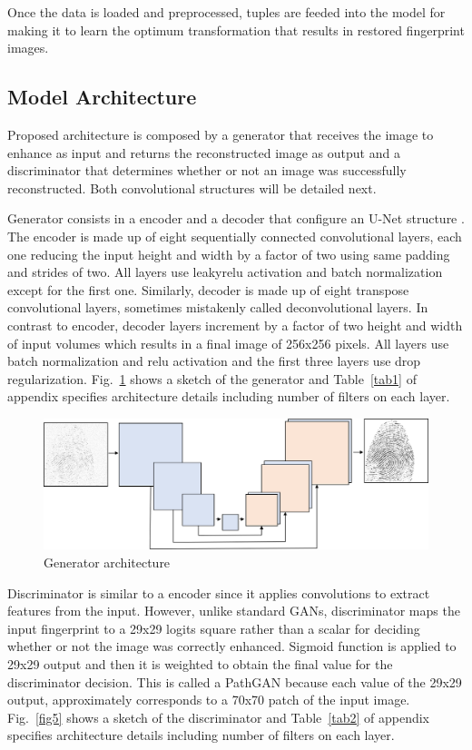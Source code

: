 \documentclass[a4paper,fleqn]{cas-dc}
\begin{document}
Once the data is loaded and preprocessed, tuples are feeded into the model for making it to learn the optimum transformation that results in restored fingerprint images.

\subsection{Model Architecture}
\label{sec:MA}

Proposed architecture is composed by a generator that receives the image to enhance as input and returns the reconstructed image as output and a discriminator that determines whether or not an image was successfully reconstructed. Both convolutional structures will be detailed next.

Generator consists in a encoder and a decoder that configure an U-Net structure \cite{UNBIS}. The encoder is made up of eight sequentially connected convolutional layers, each one reducing the input height and width by a factor of two using same padding and strides of two. All layers use leakyrelu activation and batch normalization except for the first one. Similarly, decoder is made up of eight transpose convolutional layers, sometimes mistakenly called deconvolutional layers. In contrast to encoder, decoder layers increment by a factor of two height and width of input volumes which results in a final image of 256x256 pixels. All layers use batch normalization and relu activation and the first three layers use drop regularization. Fig.~\ref{fig4} shows a sketch of the generator and Table~\ref{tab1} of appendix specifies architecture details including number of filters on each layer.

\begin{figure}[htbp]
\centerline{\includegraphics[scale=0.37]{figs/generator.png}}
\caption{Generator architecture}
\label{fig4}
\end{figure}

Discriminator is similar to a encoder since it applies convolutions to extract features from the input. However, unlike standard GANs, discriminator maps the input fingerprint to a 29x29 logits square rather than a scalar for deciding whether or not the image was correctly enhanced. Sigmoid function is applied to 29x29 output and then it is weighted to obtain the final value for the discriminator decision. This is called a PathGAN because each value of the 29x29 output, approximately corresponds to a 70x70 patch of the input image. Fig.~\ref{fig5} shows a sketch of the discriminator and Table~\ref{tab2} of appendix specifies architecture details including number of filters on each layer.
\end{document}
